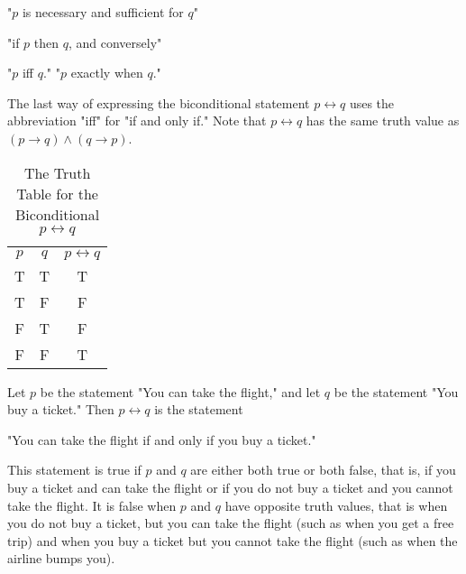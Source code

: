 \documentclass{Axon}
\begin{document}
"\(p\) is necessary and sufficient for \(q\)"

"if \(p\) then \(q\), and conversely"

"\(p\) iff \(q\)." "\(p\) exactly when \(q\)."

The last way of expressing the biconditional statement \(p \leftrightarrow q\) uses the abbreviation "iff" for "if and only if." Note that \(p \leftrightarrow q\) has the same truth value as \((p \to q) \land (q \to p)\).

\begin{table}
    \centering
    \begin{tabular}{c|c|c}
        \(p\) & \(q\) & \(p \leftrightarrow q\) \\
        T     & T     & T \\
        T     & F     & F \\
        F     & T     & F \\
        F     & F     & T \\
    \end{tabular}
    \caption{The Truth Table for the Biconditional \(p \leftrightarrow q\)}
    \label{Table: 6}
\end{table}

\begin{example}
    Let \(p\) be the statement "You can take the flight," and let \(q\) be the statement "You buy a ticket." Then \(p \leftrightarrow q\) is the statement
    \begin{center}
        "You can take the flight if and only if you buy a ticket."
    \end{center}
    This statement is true if \(p\) and \(q\) are either both true or both false, that is, if you buy a ticket and can take the flight or if you do not buy a ticket and you cannot take the flight. It is false when \(p\) and \(q\) have opposite truth values, that is when you do not buy a ticket, but you can take the flight (such as when you get a free trip) and when you buy a ticket but you cannot take the flight (such as when the airline bumps you).
\end{example}
\end{document}
